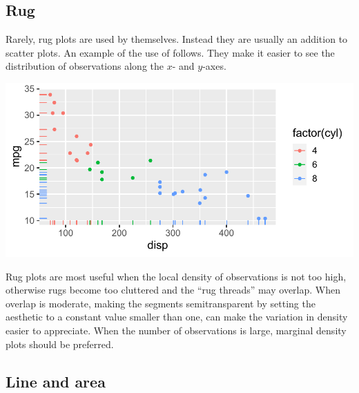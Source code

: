 \documentclass[krantz2]{krantz}\usepackage{knitr}
\begin{document}
\subsection{Rug}\label{sec:plot:rug}

Rarely, rug plots are used by themselves. Instead they are usually an addition to scatter plots. An example of the use of  follows. They make it easier to see the distribution of observations
along the $x$- and $y$-axes.

\begin{knitrout}\footnotesize
{}\color{fgcolor}\begin{kframe}
\begin{alltt}
\hlstd{(} 
       \hlstd{(}     \hlstd{=}  \hlopt{+}
  \hlstd{()} \hlopt{+}
  \hlstd{()}
\end{alltt}
\end{kframe}

{\centering \includegraphics[width=.7\textwidth]{figure/pos-rug-plot-01-1} 

}


\end{knitrout}

\begin{warningbox}
  Rug plots are most useful when the local density of observations is not too high, otherwise rugs become too cluttered and the ``rug threads'' may overlap. When overlap is moderate, making the segments semitransparent by setting the  aesthetic to a constant value smaller than one, can make the variation in density easier to appreciate. When the number of observations is large, marginal density plots should be preferred.
\end{warningbox}

\subsection{Line and area}\label{sec:plot:line}
\end{document}
